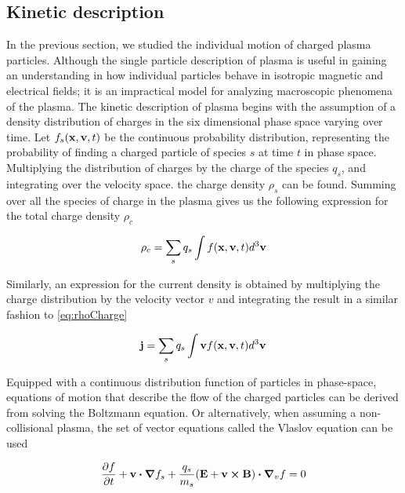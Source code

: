 \subsection{Kinetic description}
In the previous section, we studied the individual motion of charged plasma particles. Although the single particle description of plasma is useful in gaining an understanding in how individual particles behave in isotropic magnetic and electrical fields; it is an impractical model for analyzing macroscopic phenomena of the plasma.  The kinetic description of plasma begins with the assumption of a density distribution of charges in the six dimensional phase space varying over time. Let $f_s(\vb{x}, \vb{v}, t)$ be the continuous probability distribution, representing the probability of finding a charged particle of species $s$ at time $t$ in phase space. Multiplying the distribution of charges by the charge of the species $q_s$, and integrating over the velocity space. the charge density $\rho_s$ can be found. Summing over all the species of charge in the plasma gives us the following expression for the total charge density $\rho_c$

\begin{equation}\label{eq:rhoCharge}
    \rho_c = \sum_s q_s\int f(\vb{x}, \vb{v}, t) d^3\vb{v}
\end{equation}

Similarly, an expression for the current density is obtained by multiplying the charge distribution by the velocity vector $v$ and integrating the result in a similar fashion to \ref{eq:rhoCharge}

\begin{equation}
    \vb{j} = \sum_s q_s \int \vb{v} f(\vb{x}, \vb{v}, t) d^3 \vb{v}
\end{equation}


Equipped with a continuous distribution function of particles in phase-space, equations of motion that describe the flow of the charged particles can be derived from solving the Boltzmann equation. Or alternatively, when assuming a non-collisional plasma, the set of vector equations called the Vlaslov equation can be used


\begin{equation}\label{eq:vlaslov}
    \pdv{f}{t} + \vb{v} \vdot \grad{f_s} + \frac{q_s}{m_s} (\vb{E} + \vb{v} \cross \vb{B}) \vdot \grad_v{f} = 0
\end{equation}

